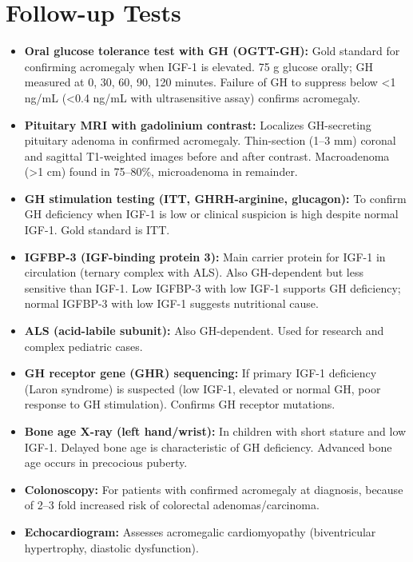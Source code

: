 \section*{Follow-up Tests}
\begin{itemize}
  \item \textbf{Oral glucose tolerance test with GH (OGTT-GH):} Gold standard for confirming acromegaly when IGF-1 is elevated. 75 g glucose orally; GH measured at 0, 30, 60, 90, 120 minutes. Failure of GH to suppress below <1 ng/mL (<0.4 ng/mL with ultrasensitive assay) confirms acromegaly.
  \item \textbf{Pituitary MRI with gadolinium contrast:} Localizes GH-secreting pituitary adenoma in confirmed acromegaly. Thin-section (1--3 mm) coronal and sagittal T1-weighted images before and after contrast. Macroadenoma (>1 cm) found in 75--80\%, microadenoma in remainder.
  \item \textbf{GH stimulation testing (ITT, GHRH-arginine, glucagon):} To confirm GH deficiency when IGF-1 is low or clinical suspicion is high despite normal IGF-1. Gold standard is ITT.
  \item \textbf{IGFBP-3 (IGF-binding protein 3):} Main carrier protein for IGF-1 in circulation (ternary complex with ALS). Also GH-dependent but less sensitive than IGF-1. Low IGFBP-3 with low IGF-1 supports GH deficiency; normal IGFBP-3 with low IGF-1 suggests nutritional cause.
  \item \textbf{ALS (acid-labile subunit):} Also GH-dependent. Used for research and complex pediatric cases.
  \item \textbf{GH receptor gene (GHR) sequencing:} If primary IGF-1 deficiency (Laron syndrome) is suspected (low IGF-1, elevated or normal GH, poor response to GH stimulation). Confirms GH receptor mutations.
  \item \textbf{Bone age X-ray (left hand/wrist):} In children with short stature and low IGF-1. Delayed bone age is characteristic of GH deficiency. Advanced bone age occurs in precocious puberty.
  \item \textbf{Colonoscopy:} For patients with confirmed acromegaly at diagnosis, because of 2--3 fold increased risk of colorectal adenomas/carcinoma.
  \item \textbf{Echocardiogram:} Assesses acromegalic cardiomyopathy (biventricular hypertrophy, diastolic dysfunction).
\end{itemize}

